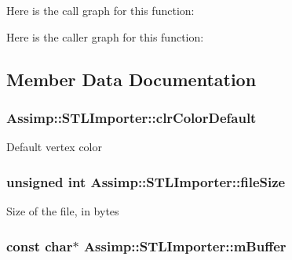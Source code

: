 Here is the call graph for this function\+:




Here is the caller graph for this function\+:




\subsection{Member Data Documentation}
\hypertarget{class_assimp_1_1_s_t_l_importer_ac0242f64ed6232dbae8bd23536611756}{
\subsubsection[{clr\+Color\+Default}]{ Assimp\+::\+S\+T\+L\+Importer\+::clr\+Color\+Default\hspace{0.3cm}{\ttfamily [protected]}}}\label{class_assimp_1_1_s_t_l_importer_ac0242f64ed6232dbae8bd23536611756}
Default vertex color \hypertarget{class_assimp_1_1_s_t_l_importer_acec6cfdb9b02a2dd06c8302b0764ee47}{
\subsubsection[{file\+Size}]{\setlength{\rightskip}{0pt plus 5cm}unsigned int Assimp\+::\+S\+T\+L\+Importer\+::file\+Size\hspace{0.3cm}{\ttfamily [protected]}}}\label{class_assimp_1_1_s_t_l_importer_acec6cfdb9b02a2dd06c8302b0764ee47}
Size of the file, in bytes \hypertarget{class_assimp_1_1_s_t_l_importer_a6b8e2e2cc22adee1e16efcf7f723a6e3}{
\subsubsection[{m\+Buffer}]{\setlength{\rightskip}{0pt plus 5cm}const char$\ast$ Assimp\+::\+S\+T\+L\+Importer\+::m\+Buffer\hspace{0.3cm}{\ttfamily [protected]}}}\label{class_assimp_1_1_s_t_l_importer_a6b8e2e2cc22adee1e16efcf7f723a6e3}

